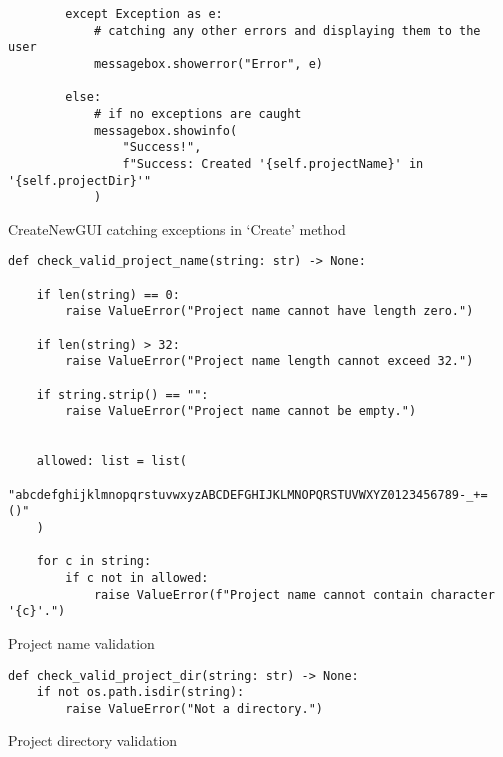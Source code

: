 \newpage
\begin{listing}[!ht]
    \begin{verbatim}
        except Exception as e:
            # catching any other errors and displaying them to the user
            messagebox.showerror("Error", e)
        
        else:
            # if no exceptions are caught
            messagebox.showinfo(
                "Success!", 
                f"Success: Created '{self.projectName}' in '{self.projectDir}'"
            )
    \end{verbatim}
    \caption{CreateNewGUI catching exceptions in `Create' method}
    \label{sc:createnew-gui-create-exceptions}
\end{listing}

\newpage
\begin{listing}[!ht]
    \begin{verbatim}
def check_valid_project_name(string: str) -> None:
    
    if len(string) == 0:
        raise ValueError("Project name cannot have length zero.")

    if len(string) > 32:
        raise ValueError("Project name length cannot exceed 32.")
    
    if string.strip() == "":
        raise ValueError("Project name cannot be empty.")


    allowed: list = list(
        "abcdefghijklmnopqrstuvwxyzABCDEFGHIJKLMNOPQRSTUVWXYZ0123456789-_+= ()"
    )
    
    for c in string:
        if c not in allowed:
            raise ValueError(f"Project name cannot contain character '{c}'.")
    \end{verbatim}
    \caption{Project name validation}
    \label{sc:project-name-validation}
\end{listing}

\newpage
\begin{listing}[!ht]
    \begin{verbatim}
def check_valid_project_dir(string: str) -> None:
    if not os.path.isdir(string):
        raise ValueError("Not a directory.")
    \end{verbatim}
    \caption{Project directory validation}
    \label{sc:project-dir-validation}
\end{listing}


